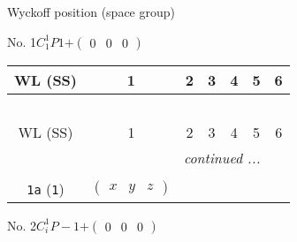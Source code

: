 \documentclass[fleqn,9pt,landscape]{jsarticle}
\begin{document}
\setcounter{MaxMatrixCols}{32}

\begin{center}
\LARGE
Wyckoff position (space group)
\end{center}
No. 1\quad$C_{1}^{1}$\quad$P1$\quad[ triclinic ]\quad$+\begin{pmatrix} 0 & 0 & 0 \end{pmatrix}$
\begin{center}
\renewcommand{\arraystretch}{1.2}
\begin{longtable}{ccccccc}
 \hline \hline
WL (SS) & 1 & 2 & 3 & 4 & 5 & 6 \\ \hline \endfirsthead

\multicolumn{6}{l}{\tablename\ \thetable{}} \\
 \hline \hline
WL (SS) & 1 & 2 & 3 & 4 & 5 & 6 \\ \hline \endhead

 \hline \hline
\multicolumn{6}{r}{\footnotesize\it continued ...} \\ \endfoot

 \hline \hline
\multicolumn{6}{r}{} \\ \endlastfoot

{\tt 1a} ({\tt 1}) & $ \begin{pmatrix} x & y & z \end{pmatrix} $ \\
\end{longtable}
\end{center}
\newpage
No. 2\quad$C_{i}^{1}$\quad$P-1$\quad[ triclinic ]\quad$+\begin{pmatrix} 0 & 0 & 0 \end{pmatrix}$
\end{document}
